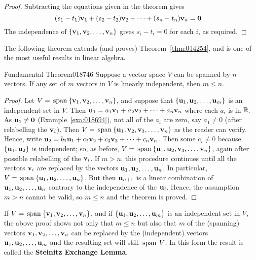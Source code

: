 \begin{proof}
Subtracting the equations given in the theorem gives
\begin{equation*}
(s_1 - t_1)\textbf{v}_1 + (s_2 - t_2)\textbf{v}_2 + \dots + (s_n - t_n)\textbf{v}_n = \textbf{0}
\end{equation*}
The independence of $\{\textbf{v}_{1}, \textbf{v}_{2}, \dots, \textbf{v}_{n}\}$ gives $s_{i} - t_{i} = 0$ for each $i$, as required.
\end{proof}

The following theorem extends (and proves) Theorem~\ref{thm:014254}, and is one of the most useful results in linear algebra.

\begin{theorem}{Fundamental Theorem}{018746}
Suppose a vector space $V$ can be spanned by $n$ vectors. If any set of $m$ vectors in $V$ is linearly independent, then $m \leq n$.
\end{theorem}

\begin{proof}
Let $V = \thinspace\operatorname{span\medspace}\{\textbf{v}_{1}, \textbf{v}_{2}, \dots, \textbf{v}_{n}\}$, and suppose that $\{\textbf{u}_{1}, \textbf{u}_{2}, \dots, \textbf{u}_{m}\}$ is an independent set in $V$. Then $\textbf{u}_{1} = a_{1}\textbf{v}_{1} + a_{2}\textbf{v}_{2} + \dots + a_{n}\textbf{v}_{n}$ where each $a_{i}$ is in $\mathbb{R}$. As $\textbf{u}_{1} \neq \textbf{0}$ (Example~\ref{exa:018694}), not all of the $a_{i}$ are zero, say $a_{1} \neq 0$ (after relabelling the $\textbf{v}_{i}$). Then $V = \thinspace\operatorname{span\medspace}\{\textbf{u}_{1}, \textbf{v}_{2}, \textbf{v}_{3}, \dots, \textbf{v}_{n}\}$ as the reader can verify. Hence, write $\textbf{u}_{2} = b_{1}\textbf{u}_{1} + c_{2}\textbf{v}_{2} + c_{3}\textbf{v}_{3} + \dots + c_{n}\textbf{v}_{n}$. Then some $c_{i} \neq 0$ because $\{\textbf{u}_{1}, \textbf{u}_{2}\}$ is independent; so, as before, $V = \thinspace\operatorname{span\medspace}\{\textbf{u}_{1}, \textbf{u}_{2}, \textbf{v}_{3}, \dots, \textbf{v}_{n}\}$, again after possible relabelling of the $\textbf{v}_{i}$. If $m > n$, this procedure continues until all the vectors $\textbf{v}_{i}$ are replaced by the vectors $\textbf{u}_{1}, \textbf{u}_{2}, \dots, \textbf{u}_{n}$. In particular, $V = \thinspace\operatorname{span\medspace}\{\textbf{u}_{1}, \textbf{u}_{2}, \dots, \textbf{u}_{n}\}$. But then $\textbf{u}_{n+1}$ is a linear combination of $\textbf{u}_{1}, \textbf{u}_{2}, \dots, \textbf{u}_{n}$ contrary to the independence of the $\textbf{u}_{i}$. Hence, the assumption $m > n$ cannot be valid, so $m \leq n$ and the theorem is proved.
\end{proof}

If $V = \thinspace\operatorname{span\medspace}\{\textbf{v}_{1}, \textbf{v}_{2}, \dots, \textbf{v}_{n}\}$, and if $\{\textbf{u}_{1}, \textbf{u}_{2}, \dots, \textbf{u}_{m}\}$ is an independent set in $V$, the above proof shows not only that $m \leq n$ but also that $m$ of the (spanning) vectors $\textbf{v}_{1}, \textbf{v}_{2}, \dots, \textbf{v}_{n}$ can be replaced by the (independent) vectors $\textbf{u}_{1}, \textbf{u}_{2}, \dots, \textbf{u}_{m}$ and the resulting set will still $\thinspace\operatorname{span\medspace} V$. In this form the result is called the \textbf{Steinitz Exchange Lemma}.

